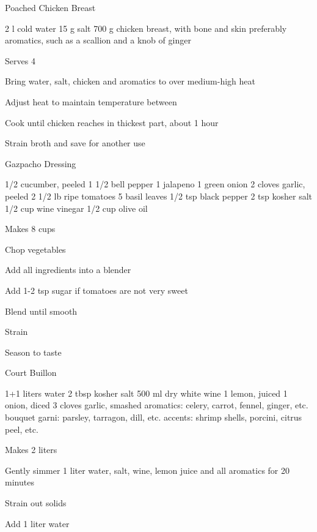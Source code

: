 \begin{recipe}{Poached Chicken Breast}{}
\begin{ingredients}
2 l cold water
15 g salt
700 g chicken breast, with bone and skin preferably
aromatics, such as a scallion and a knob of ginger
\end{ingredients}
\nextcolumn
Serves 4
\begin{steps}
    \item Bring water, salt, chicken and aromatics to  over medium-high heat
    \item Adjust heat to maintain temperature between 
    \item Cook until chicken reaches  in thickest part, about 1 hour
    \item Strain broth and save for another use
\end{steps}
\end{recipe}

\begin{recipe}{Gazpacho Dressing}{\vegetarian{}}
\begin{ingredients}
1/2 cucumber, peeled
1 1/2 bell pepper
1 jalapeno
1 green onion
2 cloves garlic, peeled
2 1/2 lb ripe tomatoes
5 basil leaves
1/2 tsp black pepper
2 tsp kosher salt
1/2 cup wine vinegar
1/2 cup olive oil
\end{ingredients}
\nextcolumn
Makes 8 cups
\begin{steps}
    \item Chop vegetables
    \item Add all ingredients into a blender 
    \item Add 1-2 tsp sugar if tomatoes are not very sweet
    \item Blend until smooth
    \item Strain
    \item Season to taste
\end{steps}
\end{recipe}

\begin{denserecipe}{Court Buillon}{}
\begin{ingredients}
1+1 liters water
2 tbsp kosher salt
500 ml dry white wine
1 lemon, juiced
1 onion, diced
3 cloves garlic, smashed
aromatics: celery, carrot, fennel, ginger, etc.
bouquet garni: parsley, tarragon, dill, etc.
accents: shrimp shells, porcini, citrus peel, etc.
\end{ingredients}
\nextcolumn
Makes 2 liters
\begin{steps}
    \item Gently simmer 1 liter water, salt, wine, lemon juice and all aromatics for 20 minutes
    \item Strain out solids
    \item Add 1 liter water
\end{steps}
\end{denserecipe}
